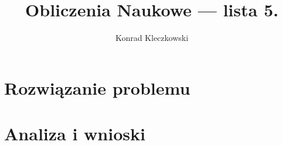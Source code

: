 \documentclass{mwrep}
\title{Obliczenia Naukowe --- lista 5.}
\author{Konrad Kleczkowski}
\begin{document}
  \maketitle
  \tableofcontents
  
  
   
  \chapter{Rozwiązanie problemu}

  \chapter{Analiza i wnioski}

  \listofalgorithms
  \listoffigures
  \listoftables
  \printbibliography[title=Literatura]
\end{document}

